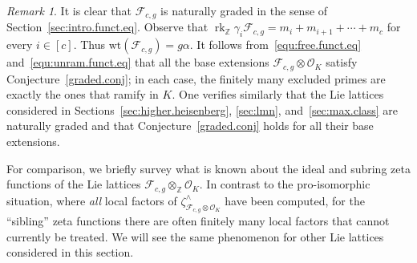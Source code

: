\documentclass[11pt,a4paper]{amsart}
\theoremstyle{plain}
\theoremstyle{remark}
\newtheorem{rem}[thm]{Remark}
\newcommand{\Z}{\mathbb{Z}}
\newcommand{\tensor}{\otimes}
\DeclareMathOperator{\rk}{rk}
\begin{document}
\begin{rem} \label{rem:graded.conj}
It is clear that $\mathcal{F}_{c,g}$ is naturally graded in the sense of Section~\ref{sec:intro.funct.eq}.  Observe that $\rk_\Z \gamma_i \mathcal{F}_{c,g} = m_i + m_{i+1} + \cdots + m_c$ for every $i \in [c]$.  Thus $\mathrm{wt}(\mathcal{F}_{c,g}) = g \alpha$.  It follows from~\eqref{equ:free.funct.eq} and~\eqref{equ:unram.funct.eq} that all the base extensions $\mathcal{F}_{c,g} \tensor \mathcal{O}_K$ satisfy Conjecture~\ref{graded.conj}; in each case, the finitely many excluded primes are exactly the ones that ramify in $K$. 
One verifies similarly that the Lie lattices considered in Sections~\ref{sec:higher.heisenberg}, \ref{sec:lmn}, and~\ref{sec:max.class} are naturally graded and that Conjecture~\ref{graded.conj} holds for all their base extensions.
\end{rem}

For comparison, we briefly survey what is known about the ideal and subring zeta functions of the Lie lattices $\mathcal{F}_{c,g} \tensor_\Z \mathcal{O}_K$.  In contrast to the pro-isomorphic situation, where {\emph{all}} local factors of $\zeta^\wedge_{\mathcal{F}_{c,g} \tensor \mathcal{O}_K}$ have been computed, for the ``sibling'' zeta functions there are often finitely many local factors that cannot currently be treated.  We will see the same phenomenon for other Lie lattices considered in this section.
\end{document}
